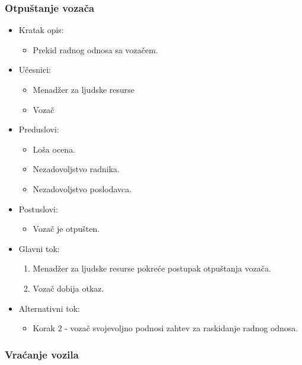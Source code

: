 \subsubsection{\bfseries Otpuštanje vozača}

\begin{itemize}
	\item Kratak opis:
		\begin{itemize}
			\item Prekid radnog odnosa sa vozačem.
		\end{itemize}
	\item Učesnici:
		\begin{itemize}
		    \item Menadžer za ljudske resurse
		    \item Vozač
		\end{itemize}
	\item Preduslovi:
		\begin{itemize}
		    \item Loša ocena.
		    \item Nezadovoljstvo radnika.
		    \item Nezadovoljstvo poslodavca.
		\end{itemize}
	\item Postuslovi:
		\begin{itemize}
			\item Vozač je otpušten.
	    \end{itemize}
	\item Glavni tok:
		\begin{enumerate}
		    \item Menadžer za ljudske resurse pokreće postupak otpuštanja vozača.
		    \item Vozač dobija otkaz.
		\end{enumerate}
	\item Alternativni tok:
		\begin{itemize}
		    \item Korak 2 - vozač svojevoljno podnosi zahtev za raskidanje radnog odnosa.
		\end{itemize}
\end{itemize}


\subsubsection{\bfseries Vraćanje vozila}

